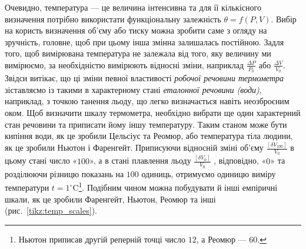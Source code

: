 
Очевидно, температура --- це величина інтенсивна та для її кількісного визначення потрібно
використати
функціональну залежність $\theta = f(P, V)$. Вибір на користь визначення об'єму або тиску можна
зробити саме з огляду на зручність, головне, щоб при цьому інша змінна залишалась постійною. Задля
того, щоб вимірювана температура не залежала від того, яку величину ми вимірюємо, за необхідністю
вимірюють відносні зміни, наприклад $\frac{\Delta P}{P_0}$  або  $\frac{\Delta V}{V_0}$. Звідси
витікає, що ці зміни певної властивості \emph{робочої речовини термометра} зіставляємо із такими в
характерному стані \emph{еталонної речовини (води)}, наприклад, з точкою танення льоду, що легко
визначається навіть неозброєним оком. Щоб визначити шкалу термометра, необхідно вибрати ще один
характерний стан речовини та приписати йому іншу температуру. Таким станом може бути кипіння води, як
це зробили Цельсіус та Реомюр, або температура тіла людини, як це зробили Ньютон і Фаренгейт.
Приписуючи відносній зміні об’єму $\frac{[\delta V_{100}]}{V_0}$  в цьому стані число «$100$», а в
стані плавлення льоду $\frac{[\delta V_{0}]}{V_0}$ , відповідно, «$0$» та розділюючи різницю
показань
на $100$ одиниць, отримуємо одиницю виміру температури $t = 1^\circ$C\footnote{Ньютон приписав другій
реперній точці число $12$, а Реомюр --- $60$.}. Подібним чином можна побудувати
й інші емпіричні шкали, як це зробили Фаренгейт, Ньютон, Реомюр та інші (рис.~\ref{tikz:temp_scales}).

